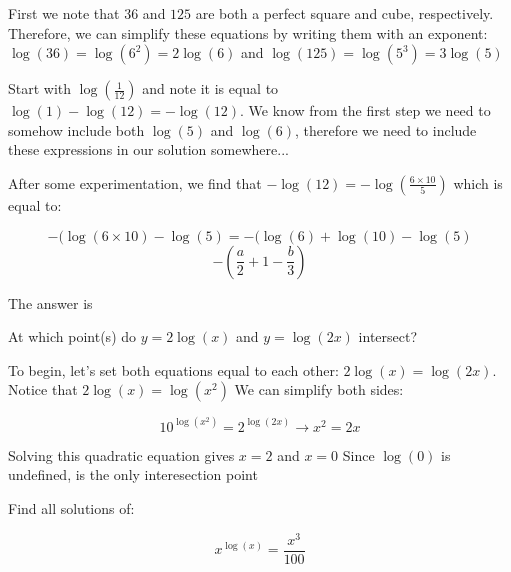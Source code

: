 \begin{solution}

First we note that $36$ and $125$ are both a perfect square and cube, respectively. Therefore, we can simplify these equations by writing them with an exponent: 
$\log(36) = \log(6^2) = 2\log(6)$ and $\log(125) = \log(5^3) = 3\log(5)$

Start with $\log(\frac{1}{12})$ and note it is equal to $\log(1)-\log(12) = -\log(12)$. We know from the first step we need to somehow include both $\log(5)$ and $\log(6)$, therefore we need to include these expressions in our solution somewhere...

After some experimentation, we find that $-\log(12) = -\log(\frac{6 \times 10}{5})$ which is equal to:

$$-(\log(6 \times 10) - \log(5) = -(\log(6)+\log(10)-\log(5)$$
$$-(\frac{a}{2}+1-\frac{b}{3})$$

The answer is 

\end{solution}


\begin{question}

At which point(s) do $y=2\log(x)$ and $y=\log(2x)$ intersect?

\end{question}

\begin{solution}

To begin, let's set both equations equal to each other: $2\log(x)=\log(2x)$. Notice that 
$2\log(x)=\log(x^2)$ We can simplify both sides:

$$10^{\log(x^2)}=2^{\log(2x)} \rightarrow x^2 = 2x $$

Solving this quadratic equation gives $x=2$ and $x=0$ Since $\log(0)$ is undefined,
 is the only interesection point

\newpage
\end{solution}

\begin{question}

Find all solutions of:

$$x^{\log(x)} = \frac{x^3}{100}$$

\end{question}

